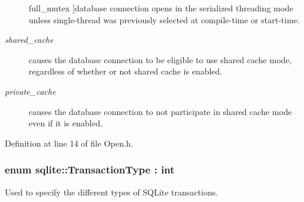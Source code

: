 \begin{Desc}
\begin{description}
{\hypertarget{a00038_ac886eded97b0430b2ab92e2d08fcf938addc995071d9f139c13354c2839603fac}{full\-\_\-mutex}\label{a00038_ac886eded97b0430b2ab92e2d08fcf938addc995071d9f139c13354c2839603fac}
}]database connection opens in the serialized threading mode unless single-\/thread was previously selected at compile-\/time or start-\/time. \item[{\em 
\hypertarget{a00038_ac886eded97b0430b2ab92e2d08fcf938a799bb323b5a99b0e122ba5aec784d314}{shared\-\_\-cache}\label{a00038_ac886eded97b0430b2ab92e2d08fcf938a799bb323b5a99b0e122ba5aec784d314}
}]causes the database connection to be eligible to use shared cache mode, regardless of whether or not shared cache is enabled. \item[{\em 
\hypertarget{a00038_ac886eded97b0430b2ab92e2d08fcf938a56ffbad7684376d679b1f0dcf37d8bf7}{private\-\_\-cache}\label{a00038_ac886eded97b0430b2ab92e2d08fcf938a56ffbad7684376d679b1f0dcf37d8bf7}
}]causes the database connection to not participate in shared cache mode even if it is enabled. \end{description}
\end{Desc}


Definition at line 14 of file Open.\-h.

\hypertarget{a00038_aea994c2d3b1e9448cd9c526b44f78890}{
\subsubsection[{Transaction\-Type}]{\setlength{\rightskip}{0pt plus 5cm}enum {\bf sqlite\-::\-Transaction\-Type} \-: int\hspace{0.3cm}{\ttfamily [strong]}}}\label{a00038_aea994c2d3b1e9448cd9c526b44f78890}


Used to specify the different types of S\-Q\-Lite transactions. 

